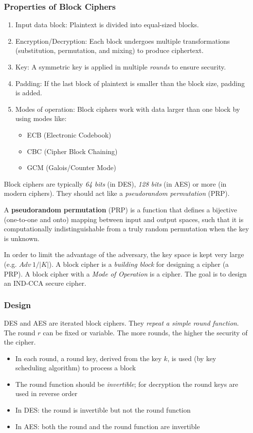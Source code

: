 \subsubsection{Properties of Block Ciphers}
\begin{enumerate}
    \item Input data block: Plaintext is divided into equal-sized blocks.
    \item Encryption/Decryption: Each block undergoes multiple transformations (substitution, permutation, and mixing) to produce ciphertext.
    \item Key: A symmetric key is applied in multiple \emph{rounds} to ensure security.
    \item Padding: If the last block of plaintext is smaller than the block size, padding is added.
    \item Modes of operation: Block ciphers work with data larger than one block by using modes like:
    \begin{itemize}
        \item ECB (Electronic Codebook)
        \item CBC (Cipher Block Chaining)
        \item GCM (Galois/Counter Mode)
    \end{itemize}
\end{enumerate}
Block ciphers are typically \emph{64 bits} (in DES), \emph{128 bits} (in AES) or more (in modern ciphers). They should act like a \emph{pseudorandom permutation} (PRP).

\begin{defn}
A \textbf{pseudorandom permutation} (PRP) is a function that defines a bijective (one-to-one and onto) mapping between input and output spaces, such that it is computationally indistinguishable from a truly random permutation when the key is unknown. 
\end{defn}

In order to limit the advantage of the adversary, the key space is kept very large (e.g. $Adv \ 1/|K|$). A block cipher is a \emph{building block} for designing a cipher (a PRP). A block cipher with a \emph{Mode of Operation} is a cipher. The goal is to design an IND-CCA secure cipher.

\subsubsection{Design}
DES and AES are iterated block ciphers. They \emph{repeat a simple round function}. The round $r$ can be fixed or variable. The more rounds, the higher the security of the cipher.
\begin{itemize}
    \item In each round, a round key, derived from the key $k$, is used (by key scheduling algorithm) to process a block
    \item The round function should be \emph{invertible}; for decryption the round keys are used in reverse order
    \item In DES: the round is invertible but not the round function
    \item In AES: both the round and the round function are invertible
\end{itemize}

